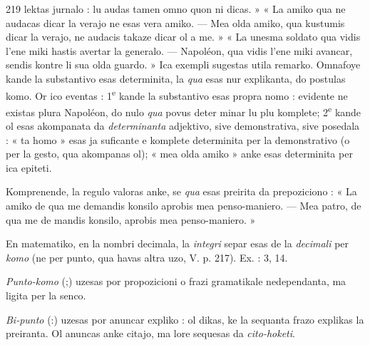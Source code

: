 \begin{VUpage}[223]{219}
\VUcontinue
lektas jurnalo : lu audas tamen omno quon ni dicas. » « La\nl
amiko qua ne audacas dicar la verajo ne esas vera amiko. ---\nl
Mea olda amiko, qua kustumis dicar la verajo, ne audacis\nl
takaze dicar ol a me. » « La unesma soldato qua vidis l'ene\cc
miki hastis avertar la generalo. --- Napoléon, qua vidis l'ene\cc
miki avancar, sendis kontre li sua olda guardo. » Ica exempli\nl
sugestas utila remarko. Omnafoye kande la substantivo esas\nl
determinita, la \textit{qua} esas nur explikanta, do postulas komo.\nl
Or ico eventas : 1\textsuperscript{e} kande la substantivo esas propra nomo :\nl
evidente ne existas plura Napoléon, do nulo \textit{qua} povus deter\cc
minar lu plu komplete; 2\textsuperscript{e} kande ol esas akompanata da\nl
\textit{determinanta} adjektivo, sive demonstrativa, sive posedala :\nl
« ta homo » esas ja suficante e komplete determinita per\nl
la demonstrativo (o per la gesto, qua akompanas ol); « mea\nl
olda amiko » anke esas determinita per ica epiteti.

Komprenende, la regulo valoras anke, se \textit{qua} esas preirita\nl
da prepoziciono : « La amiko de qua me demandis konsilo\nl
aprobis mea penso-maniero. --- Mea patro, de qua me de\cc
mandis konsilo, aprobis mea penso-maniero. »

En matematiko, en la nombri decimala, la \textit{integri} separ\cc
esas de la \textit{decimali} per \textit{komo} (ne per punto, qua havas altra\nl
uzo, V. p. 217). Ex. : 3, 14.

\textit{Punto-komo} (;) uzesas por  propozicioni o frazi\nl
gramatikale nedependanta, ma ligita per la senco.

\textit{Bi-punto} (:) uzesas por anuncar expliko : ol dikas, ke\nl
la sequanta frazo explikas la preiranta. Ol anuncas anke\nl
citajo, ma lore sequesas da \textit{cito-hoketi}.


\end{VUpage}
